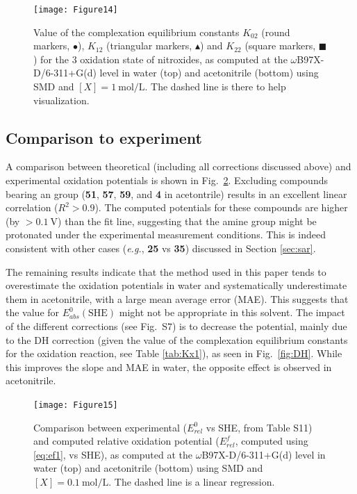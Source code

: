 \documentclass[review,preprint]{elsarticle}
\begin{document}
\begin{figure}[!h]
\centering
\texttt{[image: Figure14]}
\caption{Value of the complexation equilibrium constants $K_{02}$ (round markers, $\bullet$), $K_{12}$ (triangular markers, $\blacktriangle$) and $K_{22}$ (square markers, $\blacksquare$) for the 3 oxidation state of nitroxides, as computed at the $\omega$B97X-D/6-311+G(d) level in water (top) and acetonitrile (bottom) using SMD and $[X]=\SI{1}{\mole\per\liter}$.  The dashed line is there to help visualization. }
\label{fig:Kx2}
\end{figure}

\clearpage
\subsection{Comparison to experiment} \label{sec:exp}

A comparison between theoretical (including all corrections discussed above) and experimental oxidation potentials is shown in Fig.~\ref{fig:expvstheo}. Excluding compounds bearing an  group (\textbf{51}, \textbf{57}, \textbf{59}, and \textbf{4} in acetontrile) results in an excellent linear correlation ($R^2 > 0.9$). The computed potentials for these compounds are higher (by $>\SI{0.1}{\volt}$) than the fit line, suggesting that the amine group might be protonated under the experimental measurement conditions. This is indeed consistent with other cases (\textit{e.g.}, \textbf{25} vs \textbf{35}) discussed in Section \ref{sec:sar}. 

The remaining results indicate that the method used in this paper tends to overestimate the oxidation potentials in water and systematically underestimate them in acetonitrile, with a large mean average error (MAE). This suggests that the value for $E^0_{abs}(\text{SHE})$ might not be appropriate in this solvent. The impact of the different corrections (see Fig.~S7) is to decrease the potential, mainly due to the DH correction (given the value of the complexation equilibrium constants for the oxidation reaction, see Table \ref{tab:Kx1}), as seen in Fig.~\ref{fig:DH}. While this improves the slope and MAE in water, the opposite effect is observed in acetonitrile.

\begin{figure}[!h]
	\centering
	\texttt{[image: Figure15]}
	\caption{Comparison between experimental ($E^0_{rel} $ vs SHE, from Table S11) and computed relative oxidation potential ($E^f_{rel}$, computed using \eqref{eq:ef1}, vs SHE), as computed at the $\omega$B97X-D/6-311+G(d) level in water (top) and acetonitrile (bottom) using SMD and $[X]=\SI{0.1}{\mole\per\liter}$.  The dashed line is a linear regression.}
	\label{fig:expvstheo}
\end{figure}
\end{document}
